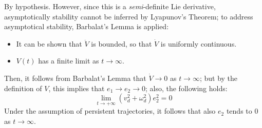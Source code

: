 By hypothesis. However, since this is a \textit{semi}-definite Lie derivative, asymptotically stability cannot be inferred by Lyapunov's Theorem; to address asymptotical stability, Barbalat's Lemma is applied:
\begin{itemize}
    \item It can be shown that $\ddot{V}$ is bounded, so that $\dot{V}$ is uniformly continuous.
    \item $V(t)$ has a finite limit as $t\rightarrow\infty$.
\end{itemize}
Then, it follows from Barbalat's Lemma that $\dot{V}\rightarrow0$ as $t\rightarrow\infty$; but by the definition of $V$, this implies that $e_1\rightarrow e_2\rightarrow0$; also, the following holds:
\begin{equation*}
    \lim_{t\rightarrow+\infty} {\left(v_d^2+\omega_d^2\right)e_2^2}=0
\end{equation*}
Under the assumption of persistent trajectories, it follows that also $e_2$ tends to $0$ as $t\rightarrow\infty$.

